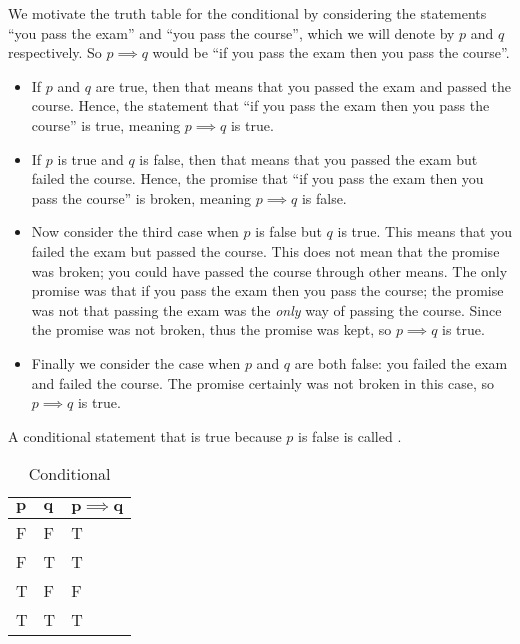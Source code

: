 We motivate the truth table for the conditional by considering the statements ``you pass the exam'' and ``you pass the course'', which we will denote by $p$ and $q$ respectively. So $p \implies q$ would be ``if you pass the exam then you pass the course''.
\begin{itemize}
    \item If $p$ and $q$ are true, then that means that you passed the exam and passed the course. Hence, the statement that ``if you pass the exam then you pass the course'' is true, meaning $p \implies q$ is true.
    \item If $p$ is true and $q$ is false, then that means that you passed the exam but failed the course. Hence, the promise that ``if you pass the exam then you pass the course'' is broken, meaning $p \implies q$ is false.
    \item Now consider the third case when $p$ is false but $q$ is true. This means that you failed the exam but passed the course. This does not mean that the promise was broken; you could have passed the course through other means. The only promise was that if you pass the exam then you pass the course; the promise was not that passing the exam was the \textit{only} way of passing the course. Since the promise was not broken, thus the promise was kept, so $p \implies q$ is true.
    \item Finally we consider the case when $p$ and $q$ are both false: you failed the exam and failed the course. The promise certainly was not broken in this case, so $p \implies q$ is true.
\end{itemize}
\begin{remark}
    A conditional statement that is true because $p$ is false is called .
\end{remark}

\begin{table}[h]
    \centering
    \begin{tabular}{|l|l||l|}
        \hline
        $\boldsymbol{p}$ & $\boldsymbol{q}$ & $\boldsymbol{p\implies q}$ \\ \hline
        F   & F   & T             \\ \hline
        F   & T   & T             \\ \hline
        T   & F   & F             \\ \hline
        T   & T   & T             \\ \hline
    \end{tabular}
    \caption{Conditional}
\end{table}

